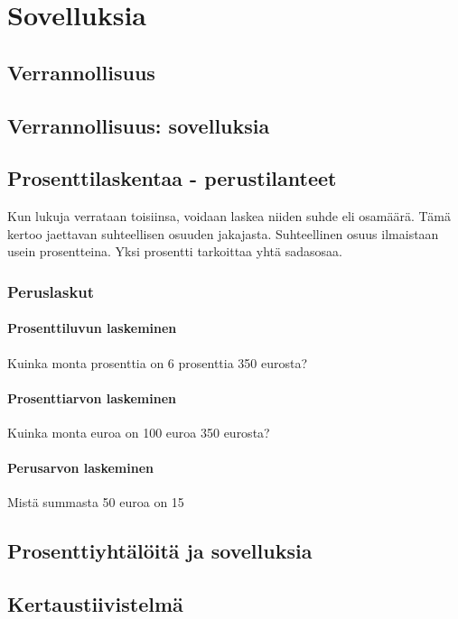 %
\part{Sovelluksia}
%
%
\chapter{Verrannollisuus}
\chapter{Verrannollisuus: sovelluksia}
\chapter{Prosenttilaskentaa - perustilanteet}
Kun lukuja verrataan toisiinsa, voidaan laskea niiden suhde eli osamäärä. Tämä kertoo jaettavan suhteellisen osuuden jakajasta. Suhteellinen osuus ilmaistaan usein prosentteina. Yksi prosentti tarkoittaa yhtä sadasosaa. %





\section{Peruslaskut}

\subsection{Prosenttiluvun laskeminen}

Kuinka monta prosenttia on 6 prosenttia 350 eurosta?

\subsection{Prosenttiarvon laskeminen}

Kuinka monta euroa on 100 euroa 350 eurosta?

\subsection{Perusarvon laskeminen}

Mistä summasta 50 euroa on 15 %

\chapter{Prosenttiyhtälöitä ja sovelluksia}
%
%
\chapter{Kertaustiivistelmä}
